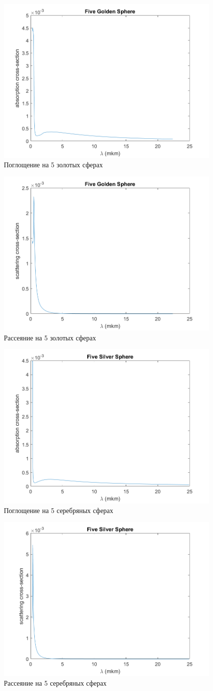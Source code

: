 \begin{figure}[h!]
	\centering
	\includegraphics[width=0.5\linewidth]{fiveGoldSphereAbsorptionSection}
	\caption{Поглощение на 5 золотых сферах}
	\label{fig:fiveGoldSphereAbsorptionSection}
\end{figure}
\begin{figure}[h!]
	\centering
	\includegraphics[width=0.5\linewidth]{fiveGoldSphereCrossSection}
	\caption{Рассеяние на 5 золотых сферах}
	\label{fig:fiveGoldSphereCrossSection}
\end{figure}
\begin{figure}[h!]
	\centering
	\includegraphics[width=0.5\linewidth]{fiveSilverSphereAbsorptionSection}
	\caption{Поглощение на 5 серебряных сферах}
	\label{fig:fiveSilverSphereAbsorptionSection}
\end{figure} 
\begin{figure}[h!]
	\centering
	\includegraphics[width=0.5\linewidth]{fiveSilverSphereCrossSection}
	\caption{Рассеяние на 5 серебряных сферах}
	\label{fig:fiveSilverSphereCrossSection}
\end{figure} 
